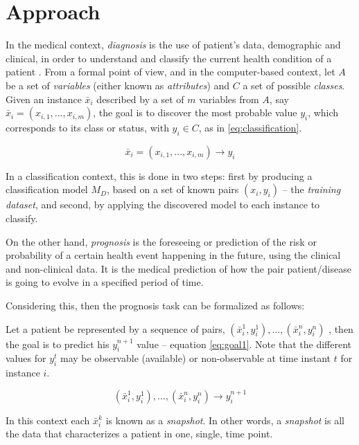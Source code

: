 \chapter{Approach}
\label{chapter:approach}


In the medical context, \emph{diagnosis} is the use of patient’s data, demographic and clinical, in order to understand 
and classify the current health condition of a patient \cite{Steyerberg2005}. From a formal point of view, and in the computer-based 
context, let $A$ be a set of \emph{variables} (either known as \emph{attributes}) and $C$ a set of possible \emph{classes}. Given an instance
 $\bar{x}_i$ described by a set of $m$ variables from $A$, say $\bar{x}_i = (x_{i,1},... ,x_{i,m})$, the goal is to discover the most
 probable value $y_i$, which corresponds to its class or status, with $y_i \in C$, as in \ref{eq:classification}.

\begin{equation}
	\bar{x}_i = (x_{i,1},... ,x_{i,m}) \rightarrow y_i
\label{eq:classification}
\end{equation}

In a classification context, this is done in two steps: first by producing a classification model $M_D$, based on a set of known
 pairs $(x_i, y_i)$ – the \emph{training dataset}, and second, by applying the discovered model to each instance to classify.

On the other hand, \emph{prognosis} is the foreseeing or prediction of the risk or probability of a certain health event happening
 in the future, using the clinical and non-clinical data. It is the medical prediction of how the pair patient/disease is going
 to evolve in a specified period of time.

Considering this, then the prognosis task can be formalized as follows:

Let a patient be represented by a sequence of pairs, $(\bar{x}_i^1,y_i^1 ),...,(\bar{x}_i^n,y_i^n )$ , then the goal is to predict
 his $y_i^{n+1}$ value – equation \ref{eq:goal1}. Note that the different values for $y_i^t$ may be observable (available) or non-observable 
 at time instant $t$ for instance $i$.

\begin{equation}
	(\bar{x}_i^1,y_i^1 ),...,(\bar{x}_i^n,y_i^n ) \rightarrow y_i^{n+1}
\label{eq:goal1}
\end{equation}

In this context each $\bar{x}_i^k$ is known as a \emph{snapshot}. In other words, a \emph{snapshot} is all the data that characterizes a 
patient in one, single, time point. 

